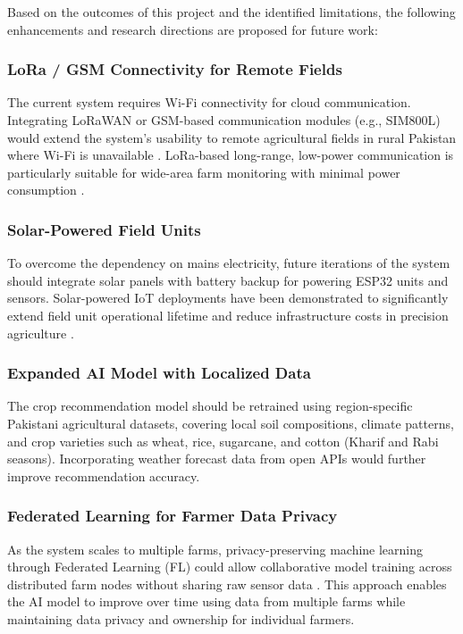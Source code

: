 Based on the outcomes of this project and the identified 
limitations, the following enhancements and research directions 
are proposed for future work:

\subsubsection{LoRa / GSM Connectivity for Remote Fields}

The current system requires Wi-Fi connectivity for cloud 
communication. Integrating LoRaWAN or GSM-based communication 
modules (e.g., SIM800L) would extend the system's usability to 
remote agricultural fields in rural Pakistan where Wi-Fi is 
unavailable \cite{mansoor2025iot}. LoRa-based long-range, 
low-power communication is particularly suitable for wide-area 
farm monitoring with minimal power consumption 
\cite{lora2024agriculture}.

\subsubsection{Solar-Powered Field Units}

To overcome the dependency on mains electricity, future 
iterations of the system should integrate solar panels with 
battery backup for powering ESP32 units and sensors. 
Solar-powered IoT deployments have been demonstrated to 
significantly extend field unit operational lifetime and 
reduce infrastructure costs in precision agriculture 
\cite{khalifeh2024solar}.

\subsubsection{Expanded AI Model with Localized Data}

The crop recommendation model should be retrained using 
region-specific Pakistani agricultural datasets, covering 
local soil compositions, climate patterns, and crop varieties 
such as wheat, rice, sugarcane, and cotton (Kharif and Rabi 
seasons). Incorporating weather forecast data from open APIs 
would further improve recommendation accuracy.

\subsubsection{Federated Learning for Farmer Data Privacy}

As the system scales to multiple farms, privacy-preserving 
machine learning through Federated Learning (FL) could allow 
collaborative model training across distributed farm nodes 
without sharing raw sensor data \cite{dwarampudi2024federated}. 
This approach enables the AI model to improve over time using 
data from multiple farms while maintaining data privacy and 
ownership for individual farmers.


